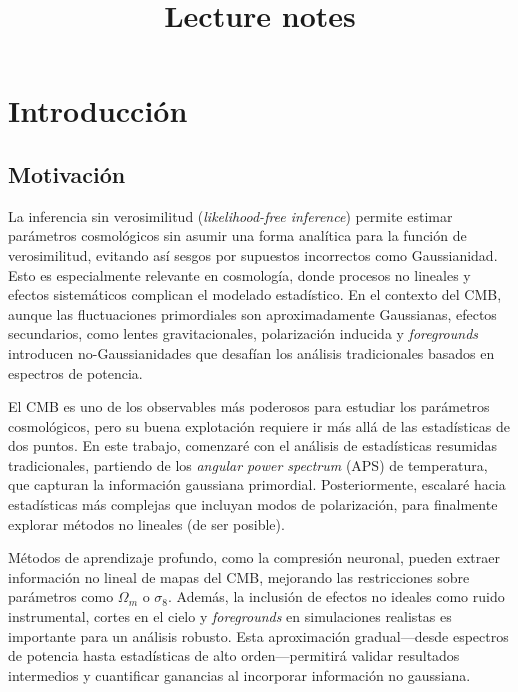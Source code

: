 \documentclass[11pt]{article}
\title{Lecture notes}
\author{}
\date{}
\begin{document}
\setlength{\parindent}{0pt}
\setlength{\parskip}{1ex}

\maketitle

\tableofcontents

\newpage

\section{Introducción}
\subsection{Motivación}
La inferencia sin verosimilitud (\textit{likelihood-free inference}) permite estimar parámetros cosmológicos sin asumir una forma analítica para la función de verosimilitud, evitando así sesgos por supuestos incorrectos como Gaussianidad. Esto es especialmente relevante en cosmología, donde procesos no lineales y efectos sistemáticos complican el modelado estadístico. En el contexto del CMB, aunque las fluctuaciones primordiales son aproximadamente Gaussianas, efectos secundarios, como lentes gravitacionales, polarización inducida y \textit{foregrounds} introducen no-Gaussianidades que desafían los análisis tradicionales basados en espectros de potencia.

El CMB es uno de los observables más poderosos para estudiar los parámetros cosmológicos, pero su buena explotación requiere ir más allá de las estadísticas de dos puntos. En este trabajo, comenzaré con el análisis de estadísticas resumidas tradicionales, partiendo de los \textit{angular power spectrum} (APS) de temperatura, que capturan la información gaussiana primordial. Posteriormente, escalaré hacia estadísticas más complejas que incluyan modos de polarización, para finalmente explorar métodos no lineales (de ser posible).

Métodos de aprendizaje profundo, como la compresión neuronal, pueden extraer información no lineal de mapas del CMB, mejorando las restricciones sobre parámetros como $\Omega_m$ o $\sigma_8$. Además, la inclusión de efectos no ideales como ruido instrumental, cortes en el cielo y \textit{foregrounds} en simulaciones realistas es importante para un análisis robusto. Esta aproximación gradual---desde espectros de potencia hasta estadísticas de alto orden---permitirá validar resultados intermedios y cuantificar ganancias al incorporar información no gaussiana.
\end{document}
